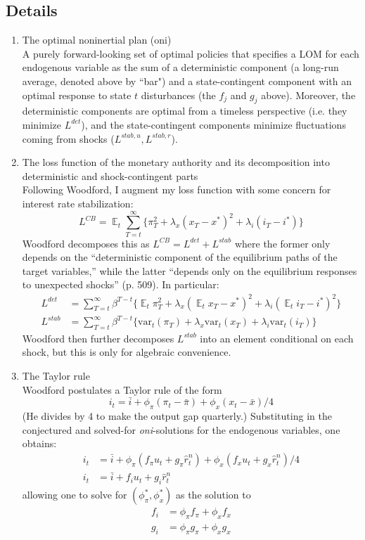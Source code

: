 \documentclass[11pt]{article}
\renewcommand{\[}{\begin{equation}}
\renewcommand{\]}{\end{equation}}
\DeclareMathOperator{\E}{\mathbb{E}}
\begin{document}
\subsection{Details}
\begin{enumerate}
\item The optimal noninertial plan (oni)\\
A purely forward-looking set of optimal policies that specifies a LOM for each endogenous variable as the sum of a deterministic component (a long-run average, denoted above by ``bar") and a state-contingent component with an optimal response to state $t$ disturbances (the $f_j$ and $g_j$ above). Moreover, the deterministic components are optimal from a timeless perspective (i.e. they minimize $L^{det}$), and the state-contingent components minimize fluctuations coming from shocks ($L^{stab,u}, L^{stab,r}$). 
\item The loss function of the monetary authority and its decomposition into deterministic and shock-contingent parts \\
Following Woodford, I augment my loss function with some concern for interest rate stabilization:
\begin{equation}
L^{CB} =\E_t \sum_{T=t}^{\infty}\{\pi_T^2 +\lambda_x(x_T - x^*)^2 +\lambda_i(i_T - i^*)\}
\end{equation}
Woodford decomposes this as $L^{CB}= L^{det} + L^{stab}$ where the former only depends on the ``deterministic component of the equilibrium paths of the target variables,'' while the latter ``depends only on the equilibrium responses to unexpected shocks'' (p. 509). In particular:
\begin{align}
L^{det} & = \sum_{T=t}^{\infty}\beta^{T-t}\{\E_t{\pi_T^2} +\lambda_x(\E_tx_T -x^*)^2 + \lambda_i(\E_ti_T -i^*)^2 \}\\
L^{stab} & = \sum_{T=t}^{\infty}\beta^{T-t}\{\text{var}_t(\pi_T)+\lambda_x\text{var}_t(x_T) + \lambda_i\text{var}_t(i_T) \}
\end{align}
Woodford then further decomposes $L^{stab}$ into an element conditional on each shock, but this is only for algebraic convenience.
\item The Taylor rule \\
Woodford postulates a Taylor rule of the form
\begin{equation}
i_t = \bar{i} + \phi_{\pi}(\pi_t - \bar{\pi}) + \phi_x(x_t -\bar{x})/4 
\end{equation}
(He divides by 4 to make the output gap quarterly.) Substituting in the conjectured and solved-for \emph{oni}-solutions for the endogenous variables, one obtains:
\begin{align}
i_t & = \bar{i} + \phi_{\pi}(f_{\pi}u_t + g_{\pi}\hat{r}_t^n) + \phi_x(f_{x}u_t + g_{x}\hat{r}_t^n)/4 \\
i_t & = \bar{i} + f_i u_t + g_i \hat{r}^n_t
\end{align}
allowing one to solve for $(\phi_{\pi}^*, \phi_x^*)$ as the solution to
\begin{align}
f_i & = \phi_{\pi}f_{\pi} + \phi_xf_{x} \\
g_i & = \phi_{\pi}g_{\pi} + \phi_xg_{x}
\end{align}
\end{enumerate}
\end{document}
